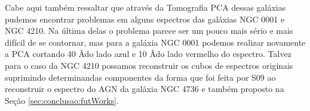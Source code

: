 Cabe aqui também ressaltar que através da Tomografia PCA dessas galáxias pudemos encontrar problemas em alguns espectros
das galáxias NGC 0001 e NGC 4210. Na última delas o problema parece ser um pouco mais sério e mais difícil de se
contornar, mas para a galáxia NGC 0001 podemos realizar novamente a PCA cortando 40 \AA do lado azul e 10 \AA do lado
vermelho do espectro. Talvez para o caso da NGC 4210 possamos reconstruir os cubos de espectros originais suprimindo
determinandas componentes da forma que foi feita por S09 ao reconstruir o espectro do AGN da galáxia NGC 4736 e também
proposto na Seção \ref{sec:conclusao:futWorks}.


